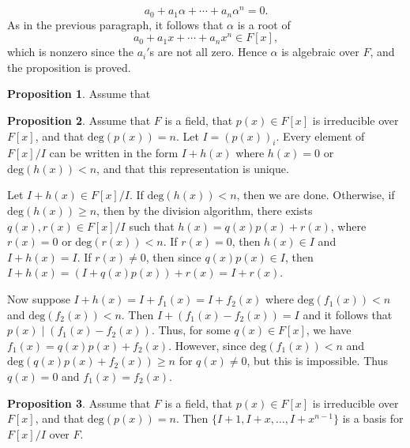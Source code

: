 \documentclass[leqno]{article}
\makeatletter
\theoremstyle{definition}
\newtheorem{prop}{Proposition}
\theoremstyle{remark}
\let\oldproofname=\proofname
\renewcommand{\proofname}{\textit{\oldproofname}}
\theoremstyle{definition}
\renewenvironment{proof}[1][\proofname]{\par
  \pushQED{\qed}%
  \normalfont \topsep6\p@\@plus6\p@\relax
  \list{}{\leftmargin=0mm
          \rightmargin=0mm
          \settowidth{\itemindent}{\itshape#1}%
          \labelwidth=\itemindent
          \parsep=0pt \listparindent=0mm%
  }
  \item[\hskip\labelsep
        \itshape
    #1\@addpunct{.}]\ignorespaces
}{%
  \popQED\endlist\@endpefalse
}
\makeatother
\begin{document}
\begin{proof}
\begin{equation*}
                a_0+a_1\alpha+\cdots+a_n\alpha^n=0.
            \end{equation*}
            As in the previous paragraph, it follows that $\alpha$ is a root of 
                \begin{equation*}
                    a_0+a_1x+\cdots+a_nx^n\in F[x],
                \end{equation*}
            which is nonzero since the $a_i'$s are not all zero. Hence $\alpha$ is algebraic over $F$, and the proposition is proved.
        \end{proof}
    \begin{prop}\label{prop:1.3}
        Assume that 
    \end{prop}
        \begin{proof}
            
        \end{proof}
    \begin{prop}\label{prop:1.4}
        Assume that $F$ is a field, that $p(x)\in F[x]$ is irreducible over $F[x]$, and that $\text{deg}(p(x))=n$. Let $I=(p(x))_i$. Every element of $F[x]/I$ can be written in the form $I+h(x)$ where $h(x)=0$ or $\text{deg}(h(x))<n$, and that this representation is unique.
    \end{prop}
        \begin{proof}
            Let $I+h(x)\in F[x]/I$. If $\text{deg}(h(x))< n$, then we are done. Otherwise, if $\text{deg}(h(x))\geq n$, then by the division algorithm, there exists $q(x),r(x)\in F[x]/I$ such that $h(x)=q(x)p(x)+r(x)$, where $r(x)=0$ or $\text{deg}(r(x))<n$. If $r(x)=0$, then $h(x)\in I$ and $I+h(x)=I$. If $r(x)\neq 0$, then since $q(x)p(x)\in I$, then $I+h(x)=(I+q(x)p(x))+r(x)=I+r(x)$.\par\hspace{4mm} Now suppose $I+h(x)=I+f_1(x)=I+f_2(x)$ where $\text{deg}(f_1(x))<n$ and $\text{deg}(f_2(x))<n$. Then $I+(f_1(x)-f_2(x))=I$ and it follows that $p(x)\mid(f_1(x)-f_2(x))$. Thus, for some $q(x)\in F[x]$, we have $f_1(x)=q(x)p(x)+f_2(x)$. However, since $\text{deg}(f_1(x))<n$ and $\text{deg}(q(x)p(x)+f_2(x))\geq n$ for $q(x)\neq 0$, but this is impossible. Thus $q(x)=0$ and $f_1(x)=f_2(x)$. 
        \end{proof}\newpage
    \begin{prop}\label{prop:1.5}
        Assume that $F$ is a field, that $p(x)\in F[x]$ is irreducible over $F[x]$, and that $\text{deg}(p(x))=n$. Then $\{I+1,I+x,\dots,I+x^{n-1}\}$ is a basis for $F[x]/I$ over $F$.
    \end{prop}
\end{document}

